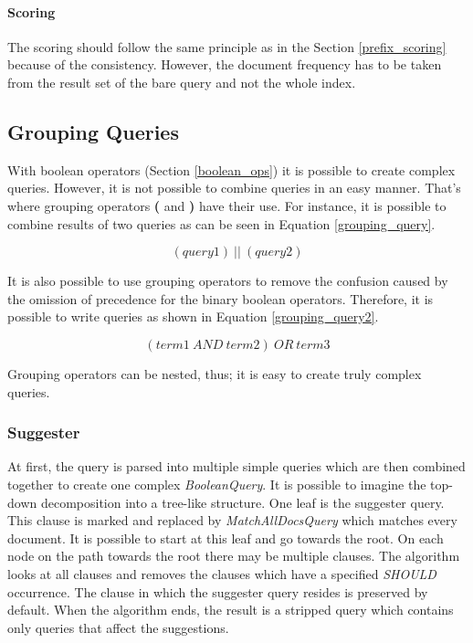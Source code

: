 \paragraph{Scoring}
The scoring should follow the same principle as in the Section \ref{prefix_scoring} because of the consistency. However,
the document frequency has to be taken from the result set of the bare query and not the whole index.

\subsection{Grouping Queries}
\label{grouping_queries}
With boolean operators (Section \ref{boolean_ops}) it is possible to create complex queries. However, it is not possible to
combine queries in an easy manner. That's where grouping operators \textbf{(} and \textbf{)} have their use. For instance,
it is possible to combine results of two queries as can be seen in Equation \ref{grouping_query}.

\begin{equation}
\label{grouping_query}
(query1)\ \vert\vert\ (query2)
\end{equation}

It is also possible to use grouping operators to remove the confusion caused by the omission of precedence for the binary
boolean operators. Therefore, it is possible to write queries as shown in Equation \ref{grouping_query2}.

\begin{equation}
\label{grouping_query2}
(term1\ AND\ term2)\ OR\ term3
\end{equation}

Grouping operators can be nested, thus; it is easy to create truly complex queries.

\subsubsection{Suggester}

At first, the query is parsed into multiple simple queries which are then combined together to create one complex
\textit{BooleanQuery}. It is possible to imagine the top-down decomposition into a tree-like structure.
One leaf is the suggester query. This clause is marked and replaced by \textit{MatchAllDocsQuery} which matches every
document. %
It is possible to start at this leaf and go towards the root. On each node on the path towards the root there may be
multiple clauses. The algorithm looks at all clauses and removes the clauses which have a specified \textit{SHOULD}
occurrence. The clause in which the suggester query resides is preserved by default. When the algorithm ends, the result
is a stripped query which contains only queries that affect the suggestions.

